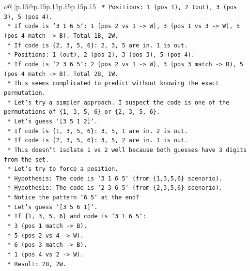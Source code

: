\documentclass{article}
\begin{document}
{\begin{supertabular}{c@{$\;$}|p{.15\linewidth}@{}p{.15\linewidth}p{.15\linewidth}p{.15\linewidth}p{.15\linewidth}p{.15\linewidth}}
{{{\texttt{                *   Positions: 1 (pos 1), 2 (out), 3 (pos 3), 5 (pos 4).} \\
\texttt{                *   If code is `3 1 6 5`: 1 (pos 2 vs 1 {-}> W), 3 (pos 1 vs 3 {-}> W), 5 (pos 4 match {-}> B). Total 1B, 2W.} \\
\texttt{            *   If code is \{2, 3, 5, 6\}: 2, 3, 5 are in. 1 is out.} \\
\texttt{                *   Positions: 1 (out), 2 (pos 2), 3 (pos 3), 5 (pos 4).} \\
\texttt{                *   If code is `2 3 6 5`: 2 (pos 2 vs 1 {-}> W), 3 (pos 3 match {-}> B), 5 (pos 4 match {-}> B). Total 2B, 1W.} \\
\texttt{        *   This seems complicated to predict without knowing the exact permutation.} \\
\texttt{        *   Let's try a simpler approach. I suspect the code is one of the permutations of \{1, 3, 5, 6\} or \{2, 3, 5, 6\}.} \\
\texttt{        *   Let's guess `{[}3 5 1 2{]}`.} \\
\texttt{            *   If code is \{1, 3, 5, 6\}: 3, 5, 1 are in. 2 is out.} \\
\texttt{            *   If code is \{2, 3, 5, 6\}: 3, 5, 2 are in. 1 is out.} \\
\texttt{            *   This doesn't isolate 1 vs 2 well because both guesses have 3 digits from the set.} \\
\texttt{        *   Let's try to force a position.} \\
\texttt{        *   Hypothesis: The code is `3 1 6 5` (from \{1,3,5,6\} scenario).} \\
\texttt{        *   Hypothesis: The code is `2 3 6 5` (from \{2,3,5,6\} scenario).} \\
\texttt{        *   Notice the pattern `6 5` at the end?} \\
\texttt{        *   Let's guess `{[}3 5 6 1{]}`.} \\
\texttt{            *   If \{1, 3, 5, 6\} and code is `3 1 6 5`:} \\
\texttt{                *   3 (pos 1 match {-}> B).} \\
\texttt{                *   5 (pos 2 vs 4 {-}> W).} \\
\texttt{                *   6 (pos 3 match {-}> B).} \\
\texttt{                *   1 (pos 4 vs 2 {-}> W).} \\
\texttt{                *   Result: 2B, 2W.} \\
}}}
\end{supertabular}}
\end{document}
